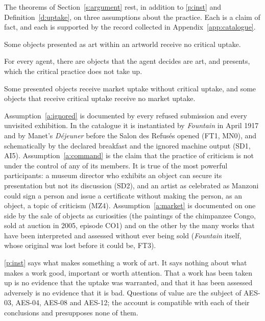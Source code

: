 \documentclass{situationist-preprint}
\begin{document}
The theorems of Section~\ref{s:argument} rest, in addition to \ref{p:inst} and Definition~\ref{d:uptake}, on three assumptions about the practice. Each is a claim of fact, and each is supported by the record collected in Appendix~\ref{app:catalogue}.

\begin{assumption}\label{a:ignored}
Some objects presented as art within an artworld receive no critical uptake.
\end{assumption}

\begin{assumption}\label{a:command}
For every agent, there are objects that the agent decides are art, and presents, which the critical practice does not take up.
\end{assumption}

\begin{assumption}\label{a:market}
Some presented objects receive market uptake without critical uptake, and some objects that receive critical uptake receive no market uptake.
\end{assumption}

Assumption~\ref{a:ignored} is documented by every refused submission and every unvisited exhibition. In the catalogue it is instantiated by \emph{Fountain} in April 1917 and by Manet's \emph{D\'ejeuner} before the Salon des Refus\'es opened (FT1, MN0), and schematically by the declared breakfast and the ignored machine output (SD1, AI5). Assumption~\ref{a:command} is the claim that the practice of criticism is not under the control of any of its members. It is true of the most powerful participants: a museum director who exhibits an object can secure its presentation but not its discussion (SD2), and an artist as celebrated as Manzoni could sign a person and issue a certificate without making the person, as an object, a topic of criticism (MZ4). Assumption~\ref{a:market} is documented on one side by the sale of objects as curiosities (the paintings of the chimpanzee Congo, sold at auction in 2005, episode CO1) and on the other by the many works that have been interpreted and assessed without ever being sold (\emph{Fountain} itself, whose original was lost before it could be, FT3).

\begin{remark}\label{r:status}
\ref{p:inst} says what makes something a work of art. It says nothing about what makes a work good, important or worth attention. That a work has been taken up is no evidence that the uptake was warranted, and that it has been assessed adversely is no evidence that it is bad. Questions of value are the subject of AES-03, AES-04, AES-08 and AES-12; the account is compatible with each of their conclusions and presupposes none of them.
\end{remark}
\end{document}
